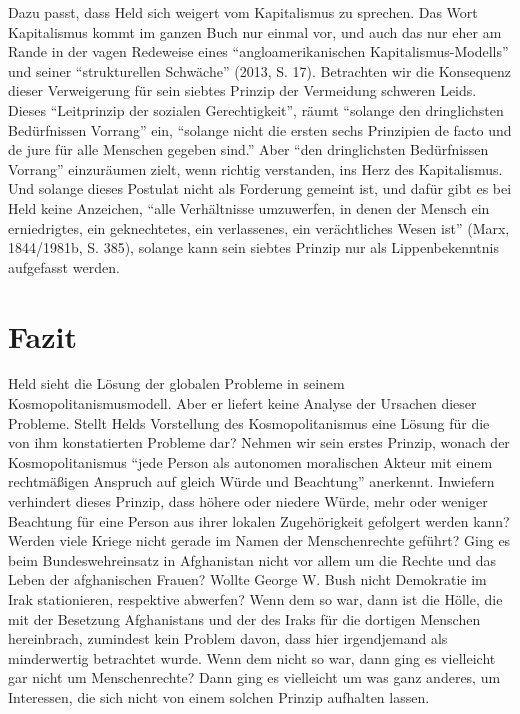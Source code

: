\documentclass[ngerman,12pt, titlepage, smallheadings, nomath]{scrartcl}
\begin{document}
Dazu passt, dass Held sich weigert vom Kapitalismus zu sprechen. Das
Wort Kapitalismus kommt im ganzen Buch nur einmal vor, und auch das nur
eher am Rande in der vagen Redeweise eines \enquote{angloamerikanischen
Kapitalismus-Modells} und seiner \enquote{strukturellen Schwäche} (2013,
S. 17). Betrachten wir die Konsequenz dieser Verweigerung für sein
siebtes Prinzip der Vermeidung schweren Leids. Dieses
\enquote{Leitprinzip der sozialen Gerechtigkeit}, räumt \enquote{solange
den dringlichsten Bedürfnissen Vorrang} ein, \enquote{solange nicht die
ersten sechs Prinzipien de facto und de jure für alle Menschen gegeben
sind.} Aber \enquote{den dringlichsten Bedürfnissen Vorrang} einzuräumen
zielt, wenn richtig verstanden, ins Herz des Kapitalismus. Und solange
dieses Postulat nicht als Forderung gemeint ist, und dafür gibt es bei
Held keine Anzeichen, \enquote{alle Verhältnisse umzuwerfen, in denen
der Mensch ein erniedrigtes, ein geknechtetes, ein verlassenes, ein
verächtliches Wesen ist} (Marx, 1844/1981b, S. 385), solange kann sein
siebtes Prinzip nur als Lippenbekenntnis aufgefasst werden.

\section{Fazit}\label{fazit}

Held sieht die Lösung der globalen Probleme in seinem
Kosmopolitanismusmodell. Aber er liefert keine Analyse der Ursachen
dieser Probleme. Stellt Helds Vorstellung des Kosmopolitanismus eine
Lösung für die von ihm konstatierten Probleme dar? Nehmen wir sein
erstes Prinzip, wonach der Kosmopolitanismus \enquote{jede Person als
autonomen moralischen Akteur mit einem rechtmäßigen Anspruch auf gleich
Würde und Beachtung} anerkennt. Inwiefern verhindert dieses Prinzip,
dass höhere oder niedere Würde, mehr oder weniger Beachtung für eine
Person aus ihrer lokalen Zugehörigkeit gefolgert werden kann? Werden
viele Kriege nicht gerade im Namen der Menschenrechte geführt? Ging es
beim Bundeswehreinsatz in Afghanistan nicht vor allem um die Rechte und
das Leben der afghanischen Frauen? Wollte George W. Bush nicht
Demokratie im Irak stationieren, respektive abwerfen? Wenn dem so war,
dann ist die Hölle, die mit der Besetzung Afghanistans und der des Iraks
für die dortigen Menschen hereinbrach, zumindest kein Problem davon,
dass hier irgendjemand als minderwertig betrachtet wurde. Wenn dem nicht
so war, dann ging es vielleicht gar nicht um Menschenrechte? Dann ging
es vielleicht um was ganz anderes, um Interessen, die sich nicht von
einem solchen Prinzip aufhalten lassen.
\end{document}
